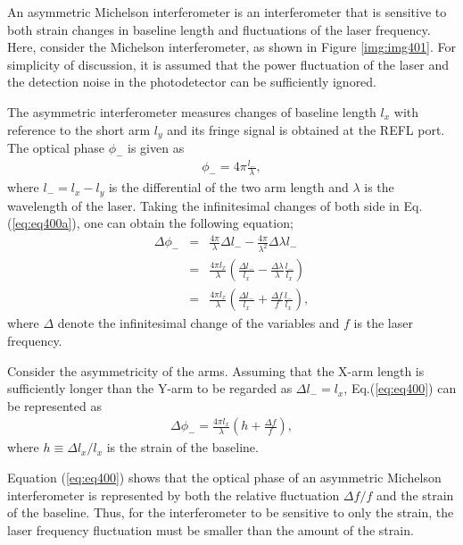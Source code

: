 An asymmetric Michelson interferometer is an interferometer that is sensitive to both strain changes in baseline length and fluctuations of the laser frequency. Here, consider the Michelson interferometer, as shown in Figure \ref{img:img401}. For simplicity of discussion, it is assumed that the power fluctuation of the laser and the detection noise in the photodetector can be sufficiently ignored. 

The asymmetric interferometer measures changes of baseline length $l_x$ with reference to the short arm $l_y$ and its fringe signal is obtained at the REFL port. The optical phase $\phi_{-}$ is given as
\begin{eqnarray}
  {\phi}_{-} = 4\pi\frac{{l_{-}}}{\lambda}, \label{eq:eq400a}
\end{eqnarray}
where ${l_{-}}=l_{x}-l_{y}$ is the differential of the two arm length and $\lambda$ is the wavelength of the laser. Taking the infinitesimal changes of both side in Eq. (\ref{eq:eq400a}), one can obtain the following equation;
\begin{eqnarray}  
  \Delta \phi_{-} &=& \frac{4\pi}{\lambda}\Delta{l_{-}} - \frac{4\pi}{\lambda^2}\Delta{\lambda}l_{-} \\
  &=& \frac{4\pi{l_{x}}}{\lambda}\left(\frac{\Delta{l_{-}}}{l_{x}} - \frac{\Delta{\lambda}}{\lambda}\frac{l_{-}}{l_{x}}\right) \\
  &=& \frac{4\pi{l_{x}}}{\lambda}\left( \frac{\Delta l_{-}}{l_{x}} + \frac{\Delta f}{f}\frac{l_{-}}{l_{x}}\right), \label{eq:eq400}
\end{eqnarray}
where $\Delta$ denote the infinitesimal change of the variables and $f$ is the laser frequency. 

Consider the asymmetricity of the arms.
Assuming that the X-arm length is sufficiently longer than the Y-arm to be regarded as $\Delta{l_{-}}=l_{x}$, Eq.(\ref{eq:eq400}) can be represented as
\begin{eqnarray}  
  \Delta \phi_{-} = \frac{4\pi{l_{x}}}{\lambda}\left(h  + \frac{\Delta f}{f}\right), \label{eq:eq400_a}
\end{eqnarray}
where $h \equiv \Delta{l_{x}}/l_x$ is the strain of the baseline.

Equation (\ref{eq:eq400}) shows that the optical phase of an asymmetric Michelson interferometer is represented by both the relative fluctuation $\Delta{f}/f$ and the strain of the baseline. Thus, for the interferometer to be sensitive to only the strain, the laser frequency fluctuation must be smaller than the amount of the strain.

